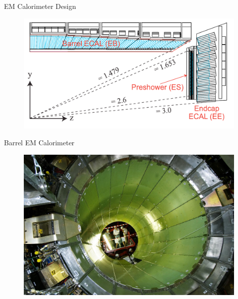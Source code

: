 \documentclass[10pt]{beamer}
\begin{document}
\begin{frame}{EM Calorimeter Design}
    \begin{figure}
        \centering
        \includegraphics[width=\textwidth]{./img/EMCal_Scheme.png}
    \end{figure}
\end{frame}

\begin{frame}[fragile]{Barrel EM Calorimeter}
    \begin{figure}
        \centering
        \includegraphics[width=\textwidth]{./img/ecal_barrel_photo.jpg}
    \end{figure}
\end{frame}
\end{document}
